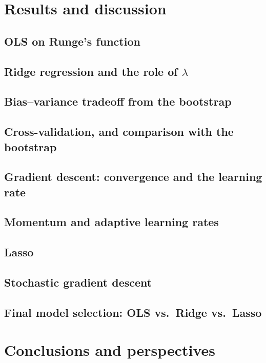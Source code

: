 \documentclass[aps,rmp,reprint,amsmath,amssymb,graphicx,longbibliography]{revtex4-1}
\begin{document}
\section{Results and discussion}\label{sec:results}

\subsection{OLS on Runge's function}
\subsection{Ridge regression and the role of $\lambda$}
\subsection{Bias--variance tradeoff from the bootstrap}
\subsection{Cross-validation, and comparison with the bootstrap}
\subsection{Gradient descent: convergence and the learning rate}
\subsection{Momentum and adaptive learning rates}
\subsection{Lasso}
\subsection{Stochastic gradient descent}
\subsection{Final model selection: OLS vs.\ Ridge vs.\ Lasso}

\section{Conclusions and perspectives}
\end{document}
